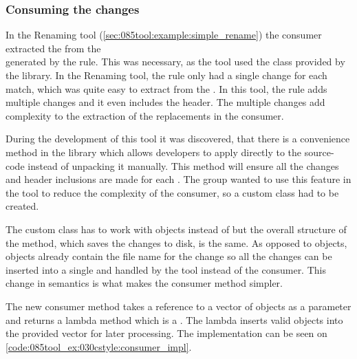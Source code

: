 \subsubsection*{Consuming the changes}

In the Renaming tool (\cref{sec:085tool:example:simple_rename}) the  consumer extracted the  from the\\
 generated by the rule. This was necessary, as the tool used the  class provided by the library. In the Renaming tool, the rule only had a single change for each match, which was quite easy to extract from the . In this tool, the rule adds multiple changes and it even includes the  header. The multiple changes add complexity to the extraction of the replacements in the consumer. 

During the development of this tool it was discovered, that there is a convenience method in the library which allows developers to apply  directly to the source-code instead of unpacking it manually. This method will ensure all the changes and header inclusions are made for each . The group wanted to use this feature in the tool to reduce the complexity of the consumer, so a custom  class had to be created.

The custom class has to work with  objects instead of  but the overall structure of the  method, which saves the changes to disk, is the same. As opposed to  objects,  objects already contain the file name for the change so all the changes can be inserted into a single  and handled by the tool instead of the consumer. This change in semantics is what makes the consumer method simpler. 

The new consumer method takes a reference to a vector of  objects as a parameter and returns a lambda method which is a . The lambda inserts valid  objects into the provided vector for later processing. The implementation can be seen on \cref{code:085tool_ex:030cstyle:consumer_impl}.

